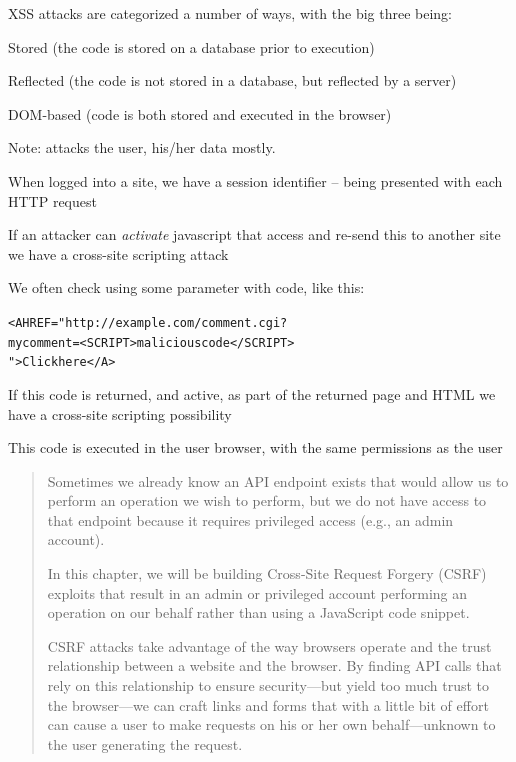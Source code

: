 \documentclass[Screen16to9,17pt]{foils}
\begin{document}
XSS attacks are categorized a number of ways, with the big three being:
\begin{list2}
\item Stored (the code is stored on a database prior to execution)
\item Reflected (the code is not stored in a database, but reflected by a server)
\item DOM-based (code is both stored and executed in the browser)
\end{list2}

Note: attacks the user, his/her data mostly.


\begin{list1}
\item When logged into a site, we have a session identifier -- being presented with each HTTP request
\item If an attacker can \emph{activate} javascript that access and re-send this to another site we have a cross-site scripting attack
\item We often check using some parameter with code, like this:
\begin{alltt}\footnotesize
<A HREF="http://example.com/comment.cgi?
mycomment=<SCRIPT>malicious code</SCRIPT>
">Click here</A>
\end{alltt}
\item If this code is returned, and active, as part of the returned page and HTML we have a cross-site scripting possibility
\item This code is executed in the user browser, with the same permissions as the user
\end{list1}


\begin{quote}
Sometimes we already know an API endpoint exists that would allow us to perform an operation we wish to perform, but we do not have access to that endpoint because it requires privileged access (e.g., an admin account).

In this chapter, we will be building Cross-Site Request Forgery (CSRF) exploits that result in an admin or privileged account performing an operation on our behalf rather than using a JavaScript code snippet.

CSRF attacks take advantage of the way browsers operate and the trust relationship between a website and the browser. By finding API calls that rely on this relationship to ensure security—but yield too much trust to the browser—we can craft links and forms that with a little bit of effort can cause a user to make requests on his or her own behalf—unknown to the user generating the request.
\end{quote}
\end{document}
